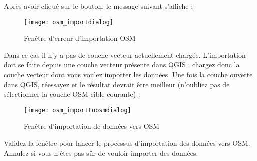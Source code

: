 Après avoir cliqué sur le bouton, le message suivant s'affiche :

\begin{figure}[ht]
   \begin{center}
   \caption{Fenêtre d'erreur d'importation OSM \nixcaption}\label{fig:osmimportmessage}\smallskip
   \texttt{[image: osm\_importdialog]}
\end{center}
\end{figure}

Dans ce cas il n'y a pas de couche vecteur actuellement chargée. L'importation doit se faire depuis une couche vecteur présente dans QGIS : chargez donc la couche vecteur dont vous voulez importer les données. Une fois la couche ouverte dans QGIS, réessayez et le résultat devrait être meilleur (n'oubliez pas de sélectionner la couche OSM cible courante) :

\begin{figure}[ht]
   \begin{center}
   \caption{Fenêtre d'importation de données vers OSM \nixcaption}\label{fig:osmimporttoosm}\smallskip
   \texttt{[image: osm\_importtoosmdialog]}
\end{center}
\end{figure}

Validez la fenêtre pour lancer le processus d'importation des données vers OSM. Annulez si vous n'êtes pas sûr de vouloir importer des données.
